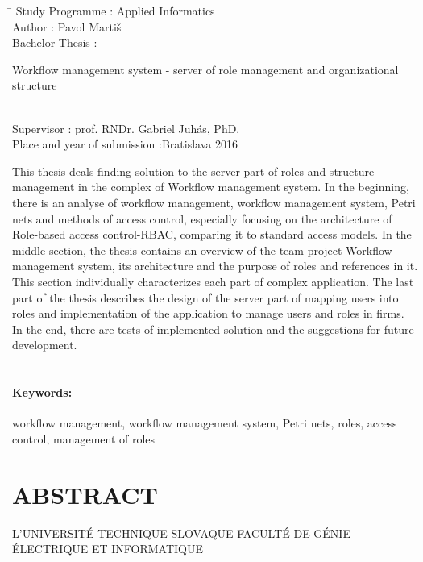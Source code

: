 \documentclass[12pt, oneside]{book}
\def\mfautor{Pavol Martiš}
\begin{document}
\begin{tabbing}	
	\hspace*{7cm}\= \kill
	Study Programme :\> Applied Informatics\\
	Author :\> \mfautor\\
	Bachelor Thesis :\>
	\begin{minipage}[t]{20em}
	Workflow management system - server of role management
	and organizational structure
	\end{minipage} \\
	Supervisor :\> prof. RNDr. Gabriel Juhás, PhD.\\
	
	Place and year of submission :\>Bratislava 2016
\end{tabbing}
This thesis deals finding solution to the server part of roles and structure management
in the complex of Workflow management system.
In the beginning, there is an analyse of workflow management, workflow management system, Petri nets 
and methods of access control, especially focusing on the architecture of Role-based access control-RBAC, comparing it to standard access models. 
In the middle section, the thesis contains an overview of the team project Workflow management system,
its architecture and the purpose of roles and references in it. This section individually characterizes each part of complex application. 
The last part of the thesis describes the design of the server part of 
mapping users into roles and implementation of the application to manage users and roles in firms. 
In the end, there are tests of implemented solution and the suggestions for future development.\\ \\


\paragraph*{Keywords:}  workflow management, workflow management system, Petri nets, roles, access control, management of roles




\newpage
\pagestyle{empty}	
\section*{\fontsize{21pt}{1.3}\selectfont ABSTRACT}

\noindent L’UNIVERSITÉ TECHNIQUE SLOVAQUE
\newline
{\fontsize{11pt}{1.3}\selectfont FACULTÉ DE GÉNIE ÉLECTRIQUE ET INFORMATIQUE\\ }
\end{document}
